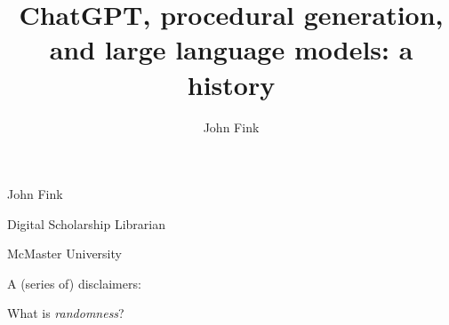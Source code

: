 \documentclass{beamer}
\title{ChatGPT, procedural generation, and large language models: a history}
\author{John Fink}
\begin{document}
\begin{frame}
    \maketitle
\end{frame}

\begin{frame}
	John Fink
	
	Digital Scholarship Librarian
	
	McMaster University
\end{frame}

% 




\begin{frame}
	A (series of) disclaimers:
\end{frame}
 

 \begin{frame}[plain]
 \end{frame}

 \begin{frame}
 	What is \textit{randomness}?
 \end{frame}
\end{document}
